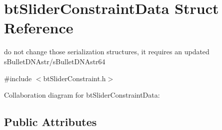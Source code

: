 \hypertarget{structbt_slider_constraint_data}{\section{bt\+Slider\+Constraint\+Data Struct Reference}
\label{structbt_slider_constraint_data}
}


do not change those serialization structures, it requires an updated s\+Bullet\+D\+N\+Astr/s\+Bullet\+D\+N\+Astr64  




{\ttfamily \#include $<$bt\+Slider\+Constraint.\+h$>$}



Collaboration diagram for bt\+Slider\+Constraint\+Data\+:
\subsection*{Public Attributes}
